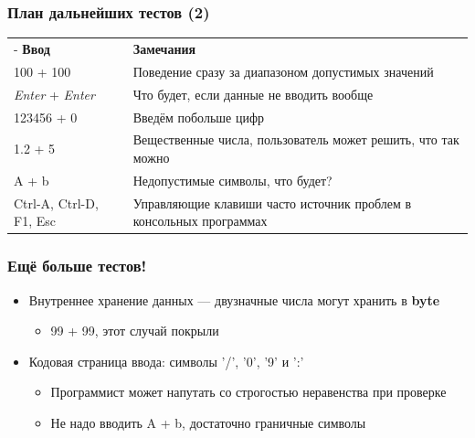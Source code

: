 \documentclass[xetex,mathserif,serif]{beamer}
\begin{document}
	\begin{frame}
		\frametitle{План дальнейших тестов (2)}
		\begin{scriptsize}
			\begin{center}
				\begin{tabu} {| X[2 l p] | X[7 l p] |}
					\tabucline-
					\everyrow{\tabucline-}
					\textbf{Ввод}                   & \textbf{Замечания}                                                 \\
					100 + 100                       & Поведение сразу за диапазоном допустимых значений                  \\
					\textit{Enter} + \textit{Enter} & Что будет, если данные не вводить вообще                           \\
					123456 + 0                      & Введём побольше цифр                                               \\
					1.2 + 5                         & Вещественные числа, пользователь может решить, что так можно       \\
					A + b                           & Недопустимые символы, что будет?                                   \\
					\item{Ctrl-A, Ctrl-D, F1, Esc}  & Управляющие клавиши часто источник проблем в консольных программах \\
				\end{tabu}
			\end{center}
		\end{scriptsize}
	\end{frame}

	\begin{frame}
		\frametitle{Ещё больше тестов!}
		\begin{itemize}
			\item Внутреннее хранение данных --- двузначные числа могут хранить в \textbf{byte}
			\begin{itemize}
				\item 99 + 99, этот случай покрыли
			\end{itemize}
			\item Кодовая страница ввода: символы '/', '0', '9' и ':'
			\begin{itemize}
				\item Программист может напутать со строгостью неравенства при проверке
				\item Не надо вводить A + b, достаточно граничные символы
			\end{itemize}
		\end{itemize}
	\end{frame}
\end{document}
